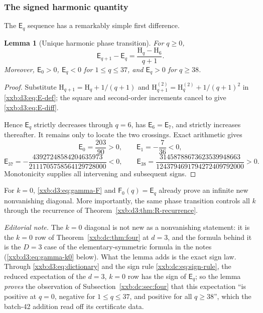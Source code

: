 \documentclass[11pt,a4paper]{article}
\numberwithin{equation}{section}
\newtheorem{lemma}[theorem]{Lemma}
\theoremstyle{definition}
\theoremstyle{remark}
\theoremstyle{plain}
\begin{document}
\subsubsection{The signed harmonic quantity}

The $\mathsf E_q$ sequence has a remarkably simple first difference.

\begin{lemma}[Unique harmonic phase transition]
\label{xxb:d3:lem:E-sign}
For $q\geq0$,
\begin{equation}
 \label{xxb:d3:eq:E-diff}
 \mathsf E_{q+1}-\mathsf E_q=\frac{\mathrm H_q-\mathrm H_6}{q+1}.
\end{equation}
Moreover,
$\mathsf E_0>0$, $\mathsf E_q<0$ for $1\leq q\leq37$, and $\mathsf E_q>0$ for
$q\geq38$.
\end{lemma}

\begin{proof}
Substitute $\mathrm H_{q+1}=\mathrm H_q+1/(q+1)$ and
$\mathrm H_{q+1}^{(2)}=\mathrm H_q^{(2)}+1/(q+1)^2$ in
\eqref{xxb:d3:eq:E-def}; the square and second-order increments cancel to give
\eqref{xxb:d3:eq:E-diff}.

Hence $\mathsf E_q$ strictly decreases through $q=6$, has
$\mathsf E_6=\mathsf E_7$, and strictly increases thereafter.  It remains only
to locate the two crossings.  Exact arithmetic gives
\[
 \mathsf E_0=\frac{203}{90}>0,
 \qquad \mathsf E_1=-\frac7{36}<0,
\]
\[
 \mathsf E_{37}=-\frac{43927248584204635973}
 {2111705758564129728000}<0,
 \qquad
 \mathsf E_{38}=\frac{31458788673623539948663}
 {1243794691794272409792000}>0.
\]
Monotonicity supplies all intervening and subsequent signs.
\end{proof}

For $k=0$, \eqref{xxb:d3:eq:gamma-F} and $\mathsf F_0(q)=\mathsf E_q$ already
prove an infinite new nonvanishing diagonal.  More importantly, the same
phase transition controls all $k$ through the recurrence of
Theorem~\ref{xxb:d3:thm:R-recurrence}.

\emph{Editorial note.}  The $k=0$ diagonal is not new as a nonvanishing
statement: it is the $k=0$ row of Theorem~\ref{xxb:dc:thm:four} at $d=3$, and
the formula behind it is the $D=3$ case of the elementary-symmetric formula in
the notes (\eqref{xxb:d3:eq:gamma-k0} below).  What the lemma adds is the exact
sign law.  Through \eqref{xxb:d3:eq:dictionary} and the sign rule
\eqref{xxb:dc:eq:sign-rule}, the reduced expectation of the $d=3$, $k=0$ row has
the sign of $\mathsf E_q$; so the lemma \emph{proves} the observation of
Subsection~\ref{xxb:dc:sec:four} that this expectation ``is positive at $q=0$,
negative for $1\le q\le37$, and positive for all $q\ge38$'', which the
batch-42 addition read off its certificate data.
\end{document}
